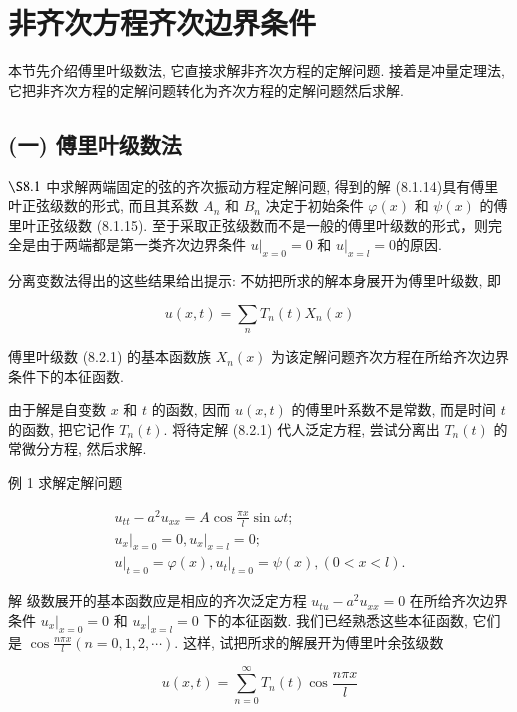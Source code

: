 
\section{非齐次方程齐次边界条件}



本节先介绍傅里叶级数法, 它直接求解非齐次方程的定解问题. 
接着是冲量定理法, 它把非齐次方程的定解问题转化为齐次方程的定解问题然后求解.

\subsection{(一) 傅里叶级数法}
$\S 8.1$ 中求解两端固定的弦的齐次振动方程定解问题, 得到的解 (8.1.14)具有傅里叶正弦级数的形式, 而且其系数 $A_{n}$ 和 $B_{n}$ 决定于初始条件 $\varphi(x)$ 和 $\psi(x)$ 的傅里叶正弦级数 (8.1.15). 至于采取正弦级数而不是一般的傅里叶级数的形式，则完全是由于两端都是第一类齐次边界条件 $\left.u\right|_{x=0}=0$ 和 $\left.u\right|_{x=l}=0$的原因.

分离变数法得出的这些结果给出提示: 不妨把所求的解本身展开为傅里叶级数, 即

$$
u(x, t)=\sum_{n} T_{n}(t) X_{n}(x)
$$

傅里叶级数 (8.2.1) 的基本函数族 $X_{n}(x)$ 为该定解问题齐次方程在所给齐次边界条件下的本征函数.

由于解是自变数 $x$ 和 $t$ 的函数, 因而 $u(x, t)$ 的傅里叶系数不是常数, 而是时间 $t$ 的函数, 把它记作 $T_{n}(t)$. 将待定解 (8.2.1) 代人泛定方程, 尝试分离出 $T_{n}(t)$ 的常微分方程, 然后求解.

例 1 求解定解问题

$$
\begin{gathered}
u_{t t}-a^{2} u_{x x}=A \cos \frac{\pi x}{l} \sin \omega t ; \\
\left.u_{x}\right|_{x=0}=0,\left.u_{x}\right|_{x=l}=0 ; \\
\left.u\right|_{t=0}=\varphi(x),\left.u_{t}\right|_{t=0}=\psi(x),(0<x<l) .
\end{gathered}
$$

解 级数展开的基本函数应是相应的齐次泛定方程 $u_{t u}-a^{2} u_{x x}=0$ 在所给齐次边界条件 $\left.u_{x}\right|_{x=0}=0$ 和 $\left.u_{x}\right|_{x=l}=0$ 下的本征函数. 我们已经熟悉这些本征函数, 它们是 $\cos \frac{n \pi x}{l}(n=0,1,2, \cdots)$. 这样, 试把所求的解展开为傅里叶余弦级数

$$
u(x, t)=\sum_{n=0}^{\infty} T_{n}(t) \cos \frac{n \pi x}{l}
$$

